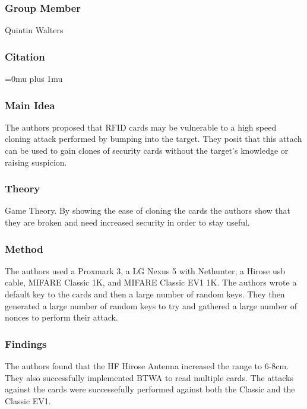 \subsubsection{Group Member}

\noindent
Quintin Walters

\noindent
\subsubsection{Citation}

\Urlmuskip=0mu plus 1mu\relax

\subsubsection{Main Idea}

\noindent
The authors proposed that RFID cards may be vulnerable to a high speed cloning attack performed by bumping into the target.  They posit that this attach can be used to gain clones of security cards without the target's knowledge or raising suspicion.

\subsubsection{Theory}

\noindent
Game Theory.  By showing the ease of cloning the cards the authors show that they are broken and need increased security in order to stay useful.

\subsubsection{Method}

\noindent
The authors used a Proxmark 3, a LG Nexus 5 with Nethunter, a Hirose usb cable, MIFARE Classic 1K, and MIFARE Classic EV1 1K.  The authors wrote a default key to the cards and then a large number of random keys.  They then generated a large number of random keys to try and gathered a large number of nonces to perform their attack.

\subsubsection{Findings}

\noindent
The authors found that the HF Hirose Antenna increased the range to 6-8cm.  They also successfully implemented BTWA to read multiple cards.  The attacks against the cards were successefully performed against both the Classic and the Classic EV1.

